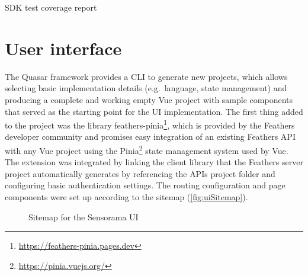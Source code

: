 \begin{listing}[!ht]
\inputminted{text}{04_Artefakte/03_Listings/sdk-test-coverage.txt}
\caption{SDK test coverage report\protect}
\label{listing:sdkCoverage}
\end{listing}

\section{User interface}
\label{sec:user-interface}

The Quasar framework provides a \ac{CLI} to generate new projects, which allows selecting basic implementation details (e.g.\ language, state management) and producing a complete and working empty Vue project with sample components that served as the starting point for the \ac{UI} implementation.
The first thing added to the project was the library feathers-pinia\footnote{\url{https://feathers-pinia.pages.dev}}, which is provided by the Feathers developer community and promises easy integration of an existing Feathers \ac{API} with any Vue project using the Pinia\footnote{\url{https://pinia.vuejs.org/}} state management system used by Vue.
The extension was integrated by linking the client library that the Feathers server project automatically generates by referencing the \ac{API}\textquotesingle s project folder and configuring basic authentication settings.
The routing configuration and page components were set up according to the sitemap (\autoref{fig:uiSitemap}).

\begin{figure}[!ht]

\caption[Sensorama UI sitemap]{Sitemap for the Sensorama UI\protect}
\label{fig:uiSitemap}
\end{figure}

